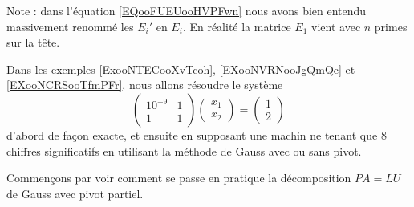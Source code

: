 Note : dans l'équation \eqref{EQooFUEUooHVPFwn} nous avons bien entendu massivement renommé les $E_i'$ en \( E_i\). En réalité la matrice \( E_1\) vient avec \( n\) primes sur la tête.

Dans les exemples \ref{ExooNTECooXvTcoh}, \ref{EXooNVRNooJgQmQc} et \ref{EXooNCRSooTfmPFr}, nous allons résoudre le système
\begin{equation}
    \begin{pmatrix}
        10^{-9}    &   1    \\ 
        1    &   1    
    \end{pmatrix}\begin{pmatrix}
        x_1    \\ 
        x_2    
    \end{pmatrix}=\begin{pmatrix}
        1    \\ 
        2    
    \end{pmatrix}
\end{equation}
d'abord de façon exacte, et ensuite en supposant une machin ne tenant que \( 8\) chiffres significatifs en utilisant la méthode de Gauss avec ou sans pivot.

Commençons par voir comment se passe en pratique la décomposition \( PA=LU\) de Gauss avec pivot partiel.

